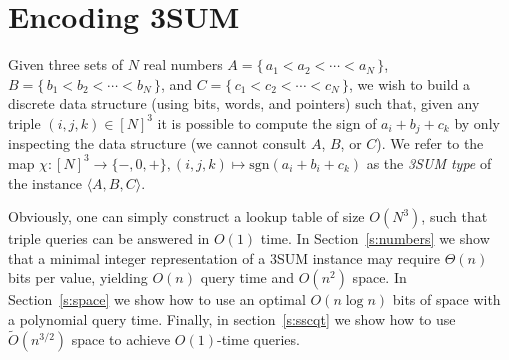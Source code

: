\chapter{Encoding 3SUM}
\label{paper:3sum-encoding}

Given three sets of \(N\) real numbers
\(A = \{\, a_1 < a_2 < \cdots < a_N\,\} \),
\(B = \{\, b_1 < b_2 < \cdots < b_N\,\} \),
and \(C = \{\, c_1 < c_2 < \cdots < c_N\,\}\),
we wish to build a discrete data structure (using bits, words, and pointers) such that,
given any triple \((i,j,k) \in {[N]}^3\) it is possible to compute the sign of
\(a_i + b_j + c_k\) by only inspecting the data structure (we cannot consult
\(A\), \(B\), or \(C\)).
We refer to the map $\chi : {[N]}^3\to \{-,0,+\}, (i,j,k)\mapsto\mathrm{sgn}
(a_i+b_i+c_k)$ as the {\em 3SUM type} of the instance $\langle A,B,C \rangle$.

Obviously, one can simply construct a lookup table of size \(O(N^3)\), such
that triple queries can be answered in \(O(1)\) time.
%
In Section~\ref{s:numbers} we show that a minimal integer representation of a
3SUM instance may require $\Theta(n)$ bits per value, yielding
$O(n)$ query time and $O(n^2)$ space.
%
In Section~\ref{s:space} we show how to use an optimal $O(n \log n)$ bits of
space with a polynomial query time. Finally, in section~\ref{s:sscqt} we show
how to use $\tilde{O}(n^{3/2})$ space to achieve $O(1)$-time queries.



